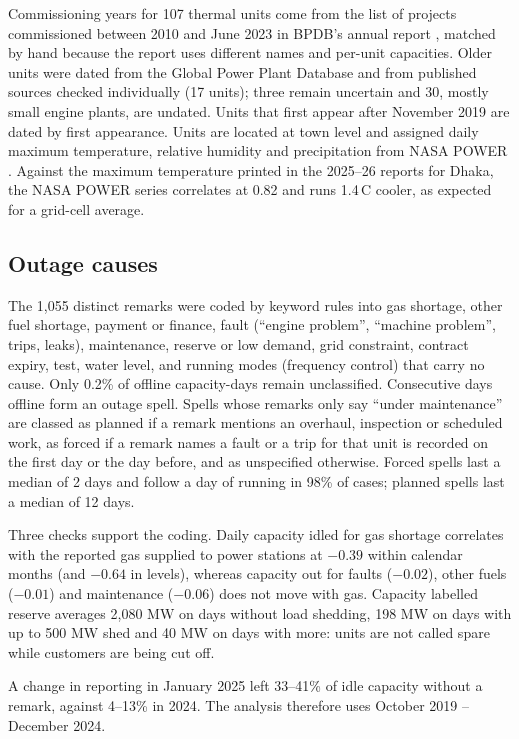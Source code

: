 \documentclass[11pt]{article}
\begin{document}
Commissioning years for 107 thermal units come from the list of projects commissioned between 2010 and June 2023 in BPDB's annual report \citep{bpdb2023annual}, matched by hand because the report uses different names and per-unit capacities. Older units were dated from the Global Power Plant Database \citep{wri2021gppd} and from published sources checked individually (17 units); three remain uncertain and 30, mostly small engine plants, are undated. Units that first appear after November 2019 are dated by first appearance. Units are located at town level and assigned daily maximum temperature, relative humidity and precipitation from NASA POWER \citep{nasapower}. Against the maximum temperature printed in the 2025--26 reports for Dhaka, the NASA POWER series correlates at 0.82 and runs 1.4\,\textdegree C cooler, as expected for a grid-cell average.

\subsection{Outage causes}
The 1,055 distinct remarks were coded by keyword rules into gas shortage, other fuel shortage, payment or finance, fault (``engine problem'', ``machine problem'', trips, leaks), maintenance, reserve or low demand, grid constraint, contract expiry, test, water level, and running modes (frequency control) that carry no cause. Only 0.2\% of offline capacity-days remain unclassified. Consecutive days offline form an outage spell. Spells whose remarks only say ``under maintenance'' are classed as planned if a remark mentions an overhaul, inspection or scheduled work, as forced if a remark names a fault or a trip for that unit is recorded on the first day or the day before, and as unspecified otherwise. Forced spells last a median of 2 days and follow a day of running in 98\% of cases; planned spells last a median of 12 days.

Three checks support the coding. Daily capacity idled for gas shortage correlates with the reported gas supplied to power stations at $-0.39$ within calendar months (and $-0.64$ in levels), whereas capacity out for faults ($-0.02$), other fuels ($-0.01$) and maintenance ($-0.06$) does not move with gas. Capacity labelled reserve averages 2,080 MW on days without load shedding, 198 MW on days with up to 500 MW shed and 40 MW on days with more: units are not called spare while customers are being cut off.

A change in reporting in January 2025 left 33--41\% of idle capacity without a remark, against 4--13\% in 2024. The analysis therefore uses October 2019 -- December 2024.
\end{document}
